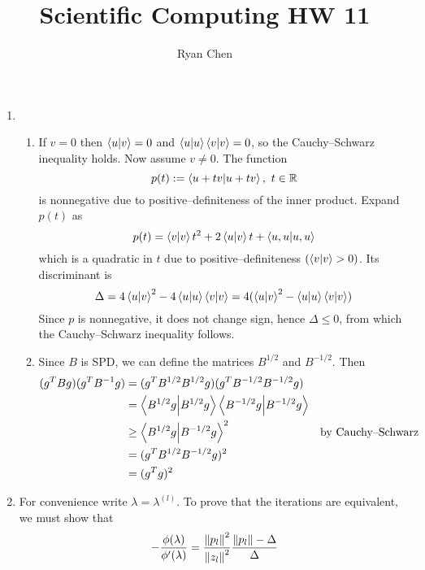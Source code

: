 \documentclass{article}
\title{Scientific Computing HW 11}
\author{Ryan Chen}
\def\mbb#1{\mathbb{#1}}
\def\bR{\mbb{R}}
\newcommand{\inv}{^{-1}}
\renewcommand{\l}{\lambda}
\newcommand{\D}{\Delta}
\begin{document}
	
\maketitle
	


\begin{enumerate}
	
	
	
	\item 
	
	\begin{enumerate}
		
		
		
		\item If $v=0$ then $\ip{u}{v}=0$ and $\ip{u}{u}\ip{v}{v}=0$, so the Cauchy--Schwarz inequality holds. Now assume $v\ne0$. The function
		\[p(t) := \ip{u+tv}{u+tv},~ t\in\bR\]
		is nonnegative due to positive--definiteness of the inner product. Expand $p(t)$ as
		\[p(t) = \ip{v}{v}t^2 + 2\ip{u}{v}t + \ip{u,u}\]
		which is a quadratic in $t$ due to positive--definiteness $(\ip{v}{v}>0)$. Its discriminant is
		\[\Delta = 4\ip{u}{v}^2 - 4\ip{u}{u}\ip{v}{v} = 4(\ip{u}{v}^2-\ip{u}{u}\ip{v}{v})\]
		Since $p$ is nonnegative, it does not change sign, hence $\Delta\le0$, from which the Cauchy--Schwarz inequality follows.
		
		
		
		\item Since $B$ is SPD, we can define the matrices $B^{1/2}$ and $B^{-1/2}$. Then
		\begin{align*}
			(g^TBg)(g^TB\inv g) &= (g^TB^{1/2}B^{1/2}g)(g^TB^{-1/2}B^{-1/2}g)\\
			&= \ip{B^{1/2}g}{B^{1/2}g}\ip{B^{-1/2}g}{B^{-1/2}g} \\
			&\ge \ip{B^{1/2}g}{B^{-1/2}g}^2 & \text{by Cauchy--Schwarz} \\
			&= (g^TB^{1/2}B^{-1/2}g)^2 \\
			&= (g^Tg)^2
		\end{align*}
		
		
		
	\end{enumerate}
	
	
	
	
	
	
	\pagebreak
	
	
	
	
	
	
	\item For convenience write $\l=\l^{(l)}$. To prove that the iterations are equivalent, we must show that
	\[-\frac{\phi(\l)}{\phi'(\l)} = \frac{\norm{p_l}^2}{\norm{z_l}^2}\frac{\norm{p_l}-\D}{\D}\]
	

\end{enumerate}
\end{document}
